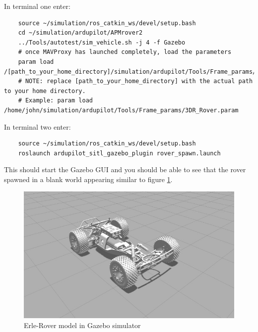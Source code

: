 \documentclass{report}
\begin{document}
In terminal one enter:
\begin{lstlisting}
	source ~/simulation/ros_catkin_ws/devel/setup.bash
	cd ~/simulation/ardupilot/APMrover2
	../Tools/autotest/sim_vehicle.sh -j 4 -f Gazebo
	# once MAVProxy has launched completely, load the parameters
	param load /[path_to_your_home_directory]/simulation/ardupilot/Tools/Frame_params/3DR_Rover.param
	# NOTE: replace [path_to_your_home_directory] with the actual path to your home directory.
	# Example: param load /home/john/simulation/ardupilot/Tools/Frame_params/3DR_Rover.param
\end{lstlisting}

In terminal two enter:
\begin{lstlisting}
	source ~/simulation/ros_catkin_ws/devel/setup.bash
	roslaunch ardupilot_sitl_gazebo_plugin rover_spawn.launch
\end{lstlisting}

This should start the Gazebo GUI and you should be able to see that the rover spawned in a blank world appearing similar to figure \ref{Erle-Rover-model}.

\begin{figure}[ht]
	\centering
	\includegraphics[scale = 0.35]{Images/rover}
	\caption{Erle-Rover model in Gazebo simulator}
	\label{Erle-Rover-model}
\end{figure}
\end{document}

